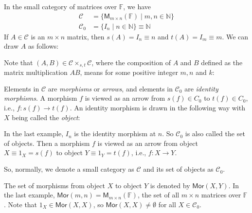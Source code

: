 \documentclass[
	11pt, %
	fleqn, %
	a4paper, %
]{LegrandOrangeBook}
\newcommand{\F}{\mathbb{F}} %
\newcommand{\M}[2]{\mathsf{M}_{#1}(#2)} %
\newcommand{\C}{\mathcal{C}} %
\newcommand{\Mor}{\mathsf{Mor}} %
\begin{document}
\begin{example}
    In the small category of matrices over $\F$, we have 
    \[
        \begin{split}
            \C &= \{ \M{m \times n}{\F} \mid m, n \in \mathbb{N} \} \\
            \C_0 &= \{ I_n \mid n \in \mathbb{N} \} \equiv \mathbb{N}
        \end{split}
    \]
    If $A \in \C$ is an $m \times n$ matrix, then $s(A) = I_n \equiv n$ and $t(A) = I_m \equiv m$. We can draw $A$ as follows:
    \begin{center}
    \end{center}
    Note that $(A, B) \in \C \times_{s, t} \C$, where the composition of $A$ and $B$ defined as the matrix multiplication $AB$, means for some positive integer $m, n$ and $k$:
    \begin{center}
    \end{center}
\end{example}
\begin{remark}
    Elements in $\C$ are \emph{morphisms} or \emph{arrows}, and elements in $\C_0$ are \emph{identity morphisms}. A morphism $f$ is viewed as an arrow from $s(f) \in C_0$ to $t(f) \in C_0$, i.e., $f : s(f) \to t(f)$. 
    An identity morphism is drawn in the following way with $X$ being called the \emph{object}:
    \begin{center}
    \end{center}
    In the last example, $I_n$ is the identity morphism at $n$. So $\C_0$ is also called the set of objects. Then a morphism $f$ is viewed as an arrow from object $X \equiv 1_X = s(f)$ to object $Y \equiv 1_Y = t(f)$, i.e., $f : X \to Y$.
\end{remark}

So, normally, we denote a small category as $\C$ and its set of objects as $\C_0$.
\begin{remark}
    The set of morphisms from object $X$ to object $Y$ is denoted by $\Mor(X, Y)$. In the last example, $\Mor(m, n) = \M{m \times n}{\F}$, the set of all $m \times n$ matrices over $\F$. Note that $1_X \in \Mor(X, X)$, so $\Mor(X, X) \neq \emptyset$ for all $X \in \C_0$.
\end{remark}
\end{document}
